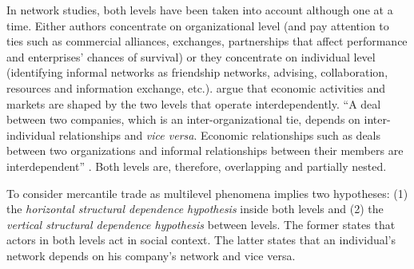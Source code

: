 \documentclass[a4paper, 12pt, openright, oneside, german, french, brazil, english, article]{abntex2}
\begin{document}
	In network studies, both levels have been taken into account although one at a time. Either authors concentrate on organizational level (and pay attention to ties such as commercial alliances, exchanges, partnerships that affect performance and enterprises' chances of survival) or they concentrate on individual level (identifying informal networks as friendship networks, advising, collaboration, resources and information exchange, etc.).  argue that economic activities and markets are shaped by the two levels that operate interdependently. ``A deal between two companies, which is an inter-organizational tie, depends on inter-individual relationships and \textit{vice versa}. Economic relationships such as deals between two organizations and informal relationships between their members are interdependent'' \cite[p. 246]{brailly2016market}. Both levels are, therefore, overlapping and partially nested.
	
	
	To consider mercantile trade as multilevel phenomena implies two hypotheses: (1) the \textit{horizontal structural dependence hypothesis} inside both levels and (2) the \textit{vertical structural dependence hypothesis} between levels. The former states that actors in both levels act in social context. The latter states that an individual's network depends on his company's network and vice versa.
	
	
\end{document}
